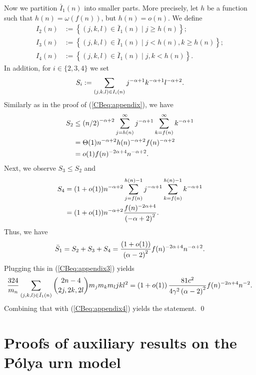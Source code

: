 Now we partition $\bar{I}_1(n)$ into smaller parts. More precisely, 
let $h$ be a function such that $h(n)=\omega\left(f(n)\right)$, but $h(n)=o\left(n\right)$. We define 
\begin{align*}
I_2(n)&:=\left\{\left(j,k,l\right) \in \bar{I}_1(n) \mid j\geq h(n)\right\};
\\
I_3(n)&:=\left\{\left(j,k,l\right) \in \bar{I}_1(n) \mid j< h(n), k \geq h(n)\right\};
\\
I_4(n)&:=\left\{\left(j,k,l\right) \in \bar{I}_1(n) \mid j,k < h(n)\right\}.
\end{align*}
In addition, for $i\in \{2,3,4\}$ we set 
\begin{align*}
S_i:=\sum_{(j,k,l)\in I_i(n)}j^{-\alpha+1}k^{-\alpha+1}l^{-\alpha+2}.
\end{align*}
Similarly as in the proof of (\ref{CBeq:appendix}), we have
\begin{align*}
S_2&\leq \left(n/2\right)^{-\alpha+2}\sum_{j=h(n)}^{\infty}j^{-\alpha+1}\sum_{k=f(n)}^{\infty}k^{-\alpha+1}
\\
&=\Theta(1)n^{-\alpha+2}h(n)^{-\alpha+2}f(n)^{-\alpha+2}
\\
&=o(1)f(n)^{-2\alpha+4}n^{-\alpha+2}.
\end{align*}
Next, we observe $S_3\leq S_2$ and
\begin{align*}
S_4&=(1+o(1))n^{-\alpha+2}\sum_{j=f(n)}^{h(n)-1}j^{-\alpha+1}\sum_{k=f(n)}^{h(n)-1}k^{-\alpha+1}
\\
&=(1+o(1))n^{-\alpha+2}\frac{f(n)^{-2\alpha+4}}{\left(-\alpha+2\right)^2}.
\end{align*}
Thus, we have 
\begin{align*}
\bar{S}_1=S_2+S_3+S_4=\frac{\left(1+o(1)\right)}{\left(\alpha-2\right)^2}f(n)^{-2\alpha+4}n^{-\alpha+2}.
\end{align*}
Plugging this in (\ref{CBeq:appendix3}) yields
\begin{align*}
\frac{324}{m_n}\sum_{(j,k,l)\in \bar{I}_1(n)}\binom{2n-4}{2j,2k,2l}m_jm_km_lj k l^2=\left(1+o(1)\right)\frac{81c^2}{4\gamma^2\left(\alpha-2\right)^2}f(n)^{-2\alpha+4}n^{-2}.
\end{align*}
Combining that with (\ref{CBeq:appendix4}) yields the statement.
\qed


\section{Proofs of auxiliary results on the P\'olya urn model} \label{CBsec:polya_proofs}


